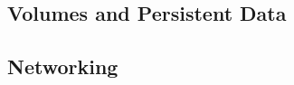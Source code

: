 

\subsection{Volumes and Persistent Data}
\label{ssec::arch:volumes}

\subsection{Networking}
\label{ssec::arch:net}
